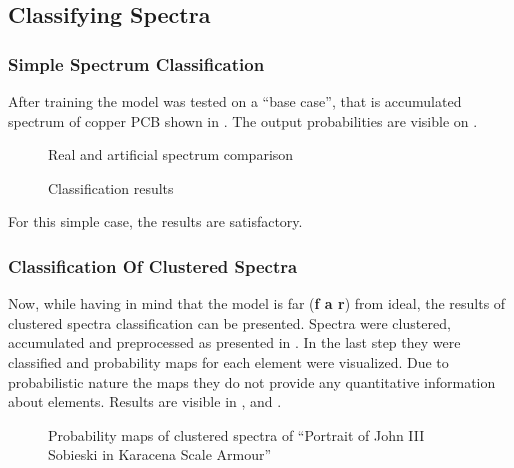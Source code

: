 \subsection{Classifying Spectra}
\subsubsection{Simple Spectrum Classification}
After training the model was tested on a ``base case'', that is accumulated spectrum of copper PCB shown in .
The output probabilities are visible on .

\begin{figure}[H]
  \centering
  
  \caption{Real and artificial spectrum comparison}
  \label{fig:spectra-comparison}
\end{figure}


\begin{figure}[H]
  \centering
  
  \caption{Classification results}
  \label{fig:copper-pcb-classification}
\end{figure}

For this simple case, the results are satisfactory.

\subsubsection{Classification Of Clustered Spectra}
Now, while having in mind that the model is far (\textbf{f a r}) from ideal, the results of clustered spectra classification can be presented. 
Spectra were clustered, accumulated and preprocessed as presented in .
In the last step they were classified and probability maps for each element were visualized.
Due to probabilistic nature the maps they do not provide any quantitative information about elements.
Results are visible in ,  and .

\begin{figure}[H]
  \centering
  
  \caption{Probability maps of clustered spectra of ``Portrait of John III Sobieski in Karacena Scale Armour''}
  \label{fig:clusters-prob-sobieski}
\end{figure}

